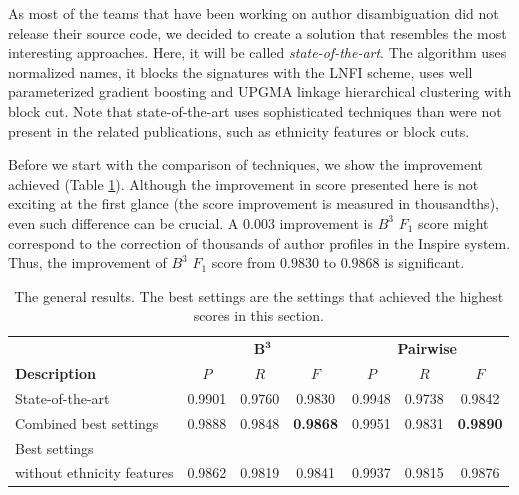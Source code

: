 \documentclass{pracamgr}
\begin{document}
As most of the teams that have been working on author disambiguation did not release their
source code, we decided to create a solution that resembles the most interesting approaches.
Here, it will be called \textit{state-of-the-art}. The algorithm uses normalized names,
it blocks the signatures with the LNFI scheme, uses well parameterized gradient boosting and
UPGMA linkage hierarchical clustering with block cut. Note that state-of-the-art uses
sophisticated techniques than were not present in the related publications,
such as ethnicity features or block cuts.

Before we start with the comparison of techniques, we show the improvement achieved
(Table \ref{tab:15}). Although the improvement in score presented here is not exciting at the first
glance (the score improvement is measured in thousandths), even such difference can be crucial.
A $0.003$ improvement is $B^{3}$ $F_{1}$ score might correspond to the correction of thousands
of author profiles in the Inspire system. Thus, the improvement of $B^{3}$ $F_{1}$ score from
$0.9830$ to $0.9868$ is significant.


\begin{table}[H]
\caption{The general results. The best settings are the settings that achieved the
highest scores in this section.}
\centering
\begin{tabular}{|l|c c c | c c c|}
  \hline
                       & \multicolumn{3}{c|}{$\mathbf{B^{3}}$} & \multicolumn{3}{c|}{\textbf{Pairwise}}\\
  \textbf{Description} & $P$ & $R$ & $F$ & $P$ & $R$ & $F$ \\
  \hline
\hline
State-of-the-art & 0.9901 & 0.9760 & 0.9830   & 0.9948 & 0.9738 & 0.9842 \\
\hline
Combined best settings & 0.9888 & 0.9848 & \textbf{0.9868}  & 0.9951 & 0.9831 & \textbf{0.9890} \\
\hline
Best settings & & & & & & \\
without ethnicity features & 0.9862 & 0.9819 & 0.9841 & 0.9937 & 0.9815 & 0.9876 \\
  \hline
\end{tabular}
\label{tab:15}
\end{table}
\end{document}
